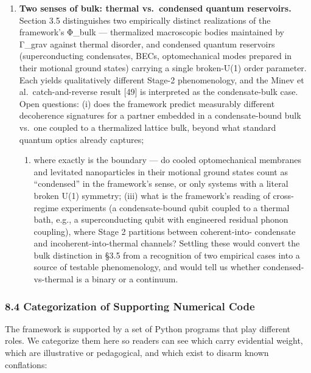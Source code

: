 \documentclass[
]{article}
\providecommand{\tightlist}{%
  \setlength{\itemsep}{0pt}\setlength{\parskip}{0pt}}
\begin{document}
\begin{enumerate}
  predicts a continuous one scaling with Φ\_grav/c² (cf.~§6.2 P5). This
  is the most direct experimental handle on the form-difference between
  the two proposals identified in §3.6.
\item
  \textbf{Two senses of bulk: thermal vs.~condensed quantum reservoirs.}
  Section 3.5 distinguishes two empirically distinct realizations of the
  framework's Φ\_bulk --- thermalized macroscopic bodies maintained by
  Γ\_grav against thermal disorder, and condensed quantum reservoirs
  (superconducting condensates, BECs, optomechanical modes prepared in
  their motional ground states) carrying a single broken-U(1) order
  parameter. Each yields qualitatively different Stage-2 phenomenology,
  and the Minev et al.~catch-and-reverse result {[}49{]} is interpreted
  as the condensate-bulk case. Open questions: (i) does the framework
  predict measurably different decoherence signatures for a partner
  embedded in a condensate-bound bulk vs.~one coupled to a thermalized
  lattice bulk, beyond what standard quantum optics already captures;

  \begin{enumerate}
  \def\labelenumii{(\roman{enumii})}
  \setcounter{enumii}{1}
  \tightlist
  \item
    where exactly is the boundary --- do cooled optomechanical membranes
    and levitated nanoparticles in their motional ground states count as
    ``condensed'' in the framework's sense, or only systems with a
    literal broken U(1) symmetry; (iii) what is the framework's reading
    of cross-regime experiments (a condensate-bound qubit coupled to a
    thermal bath, e.g., a superconducting qubit with engineered residual
    phonon coupling), where Stage 2 partitions between coherent-into-
    condensate and incoherent-into-thermal channels? Settling these
    would convert the bulk distinction in §3.5 from a recognition of two
    empirical cases into a source of testable phenomenology, and would
    tell us whether condensed-vs-thermal is a binary or a continuum.
  \end{enumerate}
\end{enumerate}

\subsubsection{8.4 Categorization of Supporting Numerical
Code}\label{categorization-of-supporting-numerical-code}

The framework is supported by a set of Python programs that play
different roles. We categorize them here so readers can see which carry
evidential weight, which are illustrative or pedagogical, and which
exist to disarm known conflations:
\end{document}

